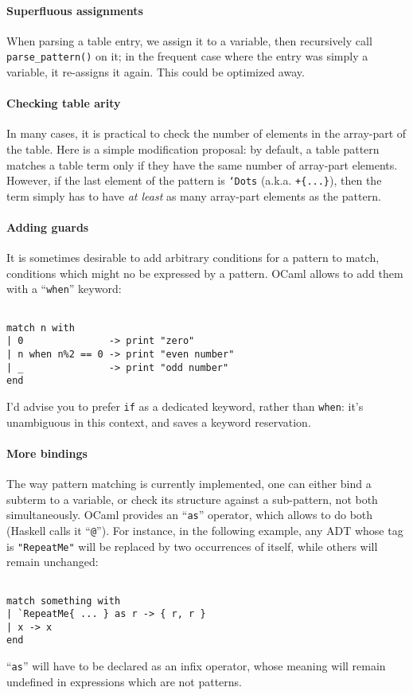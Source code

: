 \paragraph{Superfluous assignments} When parsing a table entry, we
assign it to a variable, then recursively call {\tt parse\_pattern()}
on it; in the frequent case where the entry was simply a variable, it
re-assigns it again. This could be optimized away.

\paragraph{Checking table arity} In many cases, it is practical to
check the number of elements in the array-part of the table. Here is a
simple modification proposal: by default, a table pattern matches a
table term only if they have the same number of array-part
elements. However, if the last element of the pattern is {\tt`Dots}
(a.k.a. {\tt+\{...\}}), then the term simply has to have 
{\it at least} as many array-part elements as the pattern.

\paragraph{Adding guards}
It is sometimes desirable to add arbitrary conditions for a pattern to
match, conditions which might no be expressed by a pattern. OCaml
allows to add them with a ``\verb|when|'' keyword:
\begin{Verbatim}[fontsize=\scriptsize]

match n with
| 0               -> print "zero"
| n when n%2 == 0 -> print "even number"
| _               -> print "odd number"
end
\end{Verbatim}
I'd advise you to prefer {\tt if} as a dedicated keyword, rather than
{\tt when}: it's unambiguous in this context, and saves a keyword
reservation. 

\paragraph{More bindings}
The way pattern matching is currently implemented, one can either bind
a subterm to a variable, or check its structure against a sub-pattern,
not both simultaneously. OCaml provides an ``\verb|as|'' operator,
which allows to do both (Haskell calls it ``\verb|@|''). For instance,
in the following example, any ADT whose tag is \verb|"RepeatMe"| will
be replaced by two occurrences of itself, while others will remain
unchanged:
\begin{Verbatim}[fontsize=\scriptsize]

match something with
| `RepeatMe{ ... } as r -> { r, r }
| x -> x
end
\end{Verbatim}
``\verb|as|'' will have to be declared as an infix operator, whose
meaning will remain undefined in expressions which are not patterns.

